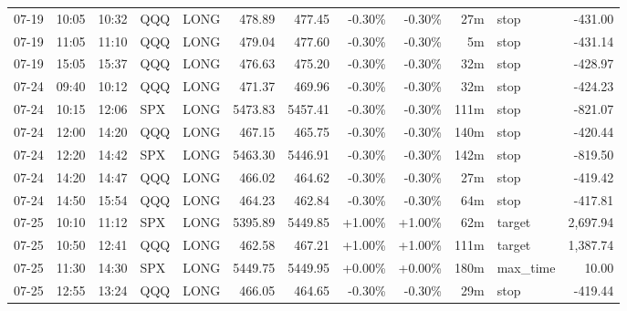 \documentclass[11pt,a4paper,twoside]{article}
\begin{document}
\begin{center}
\begin{longtable}{>{\color{txtmain}}l l l l l r r r r r >{\color{txtmain}}l r}
07-19 & 10:05 & 10:32 & QQQ & LONG & 478.89 & 477.45 & \textcolor{lossred}{-0.30\%} & \textcolor{lossred}{-0.30\%} & 27m & stop & \textcolor{lossred}{-431.00} \\
07-19 & 11:05 & 11:10 & QQQ & LONG & 479.04 & 477.60 & \textcolor{lossred}{-0.30\%} & \textcolor{lossred}{-0.30\%} & 5m & stop & \textcolor{lossred}{-431.14} \\
07-19 & 15:05 & 15:37 & QQQ & LONG & 476.63 & 475.20 & \textcolor{lossred}{-0.30\%} & \textcolor{lossred}{-0.30\%} & 32m & stop & \textcolor{lossred}{-428.97} \\
07-24 & 09:40 & 10:12 & QQQ & LONG & 471.37 & 469.96 & \textcolor{lossred}{-0.30\%} & \textcolor{lossred}{-0.30\%} & 32m & stop & \textcolor{lossred}{-424.23} \\
07-24 & 10:15 & 12:06 & SPX & LONG & 5473.83 & 5457.41 & \textcolor{lossred}{-0.30\%} & \textcolor{lossred}{-0.30\%} & 111m & stop & \textcolor{lossred}{-821.07} \\
07-24 & 12:00 & 14:20 & QQQ & LONG & 467.15 & 465.75 & \textcolor{lossred}{-0.30\%} & \textcolor{lossred}{-0.30\%} & 140m & stop & \textcolor{lossred}{-420.44} \\
07-24 & 12:20 & 14:42 & SPX & LONG & 5463.30 & 5446.91 & \textcolor{lossred}{-0.30\%} & \textcolor{lossred}{-0.30\%} & 142m & stop & \textcolor{lossred}{-819.50} \\
07-24 & 14:20 & 14:47 & QQQ & LONG & 466.02 & 464.62 & \textcolor{lossred}{-0.30\%} & \textcolor{lossred}{-0.30\%} & 27m & stop & \textcolor{lossred}{-419.42} \\
07-24 & 14:50 & 15:54 & QQQ & LONG & 464.23 & 462.84 & \textcolor{lossred}{-0.30\%} & \textcolor{lossred}{-0.30\%} & 64m & stop & \textcolor{lossred}{-417.81} \\
07-25 & 10:10 & 11:12 & SPX & LONG & 5395.89 & 5449.85 & \textcolor{wingreen}{+1.00\%} & \textcolor{wingreen}{+1.00\%} & 62m & target & \textcolor{wingreen}{2,697.94} \\
07-25 & 10:50 & 12:41 & QQQ & LONG & 462.58 & 467.21 & \textcolor{wingreen}{+1.00\%} & \textcolor{wingreen}{+1.00\%} & 111m & target & \textcolor{wingreen}{1,387.74} \\
07-25 & 11:30 & 14:30 & SPX & LONG & 5449.75 & 5449.95 & \textcolor{wingreen}{+0.00\%} & \textcolor{wingreen}{+0.00\%} & 180m & max\_time & \textcolor{wingreen}{10.00} \\
07-25 & 12:55 & 13:24 & QQQ & LONG & 466.05 & 464.65 & \textcolor{lossred}{-0.30\%} & \textcolor{lossred}{-0.30\%} & 29m & stop & \textcolor{lossred}{-419.44} \\

\end{longtable}
\end{center}
\end{document}
